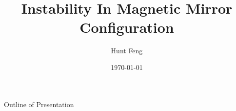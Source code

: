 \documentclass{beamer}
\title{Instability In Magnetic Mirror Configuration}
\author{Hunt Feng}
\institute{University of Saskatchewan}
\date{\today}
\begin{document}
	\frame{\titlepage}
	\begin{frame}{Outline of Presentation}
		\tableofcontents
	\end{frame}

	
	
	
	

	
	 
\end{document}

